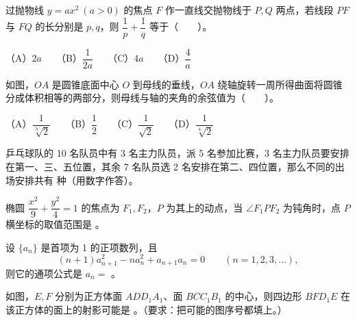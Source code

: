 \begin{question}
过抛物线 $y=ax^2\ (a>0)$ 的焦点 $F$ 作一直线交抛物线于 $P,Q$ 两点，若线段 $PF$ 与 $FQ$ 的长分别是 $p,q$，则 $\dfrac{1}{p}+\dfrac{1}{q}$ 等于\mbox{（　　）}。

（A）$2a$　　（B）$\dfrac{1}{2a}$　　（C）$4a$　　（D）$\dfrac{4}{a}$

\Needspace{0.4\textheight}
\end{question}
\begin{question}
如图，$OA$ 是圆锥底面中心 $O$ 到母线的垂线，$OA$ 绕轴旋转一周所得曲面将圆锥分成体积相等的两部分，则母线与轴的夹角的余弦值为\mbox{（　　）}。
\nopagebreak[4]
\begin{center}\end{center}
\nopagebreak[4]
（A）$\dfrac{1}{\sqrt[3]{2}}$　　（B）$\dfrac{1}{2}$　　（C）$\dfrac{1}{\sqrt{2}}$　　（D）$\dfrac{1}{\sqrt[4]{2}}$

\end{question}

\begin{question}
乒乓球队的 10 名队员中有 3 名主力队员，派 5 名参加比赛，3 名主力队员要安排在第一、三、五位置，其余 7 名队员选 2 名安排在第二、四位置，那么不同的出场安排共有 \gkblank{} 种（用数字作答）。

\end{question}
\begin{question}
椭圆 $\dfrac{x^2}{9}+\dfrac{y^2}{4}=1$ 的焦点为 $F_1,F_2$，$P$ 为其上的动点，当 $\angle F_1PF_2$ 为钝角时，点 $P$ 横坐标的取值范围是 \gkblank{}。

\end{question}
\begin{question}
设 $\{a_n\}$ 是首项为 1 的正项数列，且
\nopagebreak[4]
\[
(n+1)a_{n+1}^{2}-na_n^{2}+a_{n+1}a_n=0\qquad(n=1,2,3,\ldots),
\]
则它的通项公式是 $a_n=$ \gkblank{}。

\Needspace{0.4\textheight}
\end{question}
\begin{question}
如图，$E,F$ 分别为正方体面 $ADD_1A_1$、面 $BCC_1B_1$ 的中心，则四边形 $BFD_1E$ 在该正方体的面上的射影可能是 \gkblank{}。（要求：把可能的图序号都填上。）
\nopagebreak[4]
\begin{center}\end{center}
\nopagebreak[4]
\end{question}

